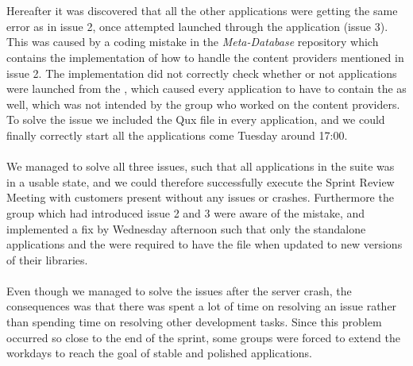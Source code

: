 \\\\
Hereafter it was discovered that all the other applications were getting the same error as in issue 2, once attempted launched through the \launcher application (issue 3). This was caused by a coding mistake in the \emph{Meta-Database} repository which contains the implementation of how to handle the content providers mentioned in issue 2. The implementation did not correctly check whether or not applications were launched from the \launcher, which caused every application to have to contain the  as well, which was not intended by the group who worked on the content providers. To solve the issue we included the Qux file in every application, and we could finally correctly start all the applications come Tuesday around 17:00. 
\\\\
We managed to solve all three issues, such that all applications in the \giraf suite was in a usable state, and we could therefore successfully execute the Sprint Review Meeting with customers present without any issues or crashes. Furthermore the group which had introduced issue 2 and 3 were aware of the mistake, and implemented a fix by Wednesday afternoon such that only the standalone applications and the \launcher were required to have the  file when updated to new versions of their libraries.
\\\\
Even though we managed to solve the issues after the server crash, the consequences was that there was spent a lot of time on resolving an issue rather than spending time on resolving other development tasks. Since this problem occurred so close to the end of the sprint, some groups were forced to extend the workdays to reach the goal of stable and polished applications.
